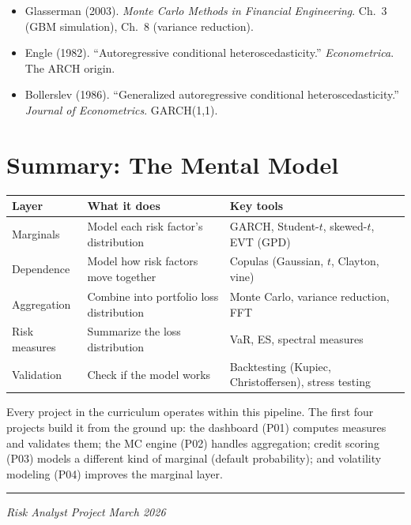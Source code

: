 \documentclass[11pt, a4paper]{article}
\theoremstyle{definition}
\theoremstyle{plain}
\theoremstyle{remark}
\begin{document}
\begin{refbox}
\begin{itemize}
    \item Glasserman (2003). \emph{Monte Carlo Methods in Financial Engineering}. Ch.~3 (GBM simulation), Ch.~8 (variance reduction).
    \item Engle (1982). ``Autoregressive conditional heteroscedasticity.'' \emph{Econometrica}. The ARCH origin.
    \item Bollerslev (1986). ``Generalized autoregressive conditional heteroscedasticity.'' \emph{Journal of Econometrics}. GARCH(1,1).
\end{itemize}
\end{refbox}

\section{Summary: The Mental Model}

\begin{center}
\begin{tabular}{@{}p{3cm}p{4.5cm}p{5cm}@{}}
\toprule
\textbf{Layer} & \textbf{What it does} & \textbf{Key tools} \\
\midrule
Marginals & Model each risk factor's distribution & GARCH, Student-$t$, skewed-$t$, EVT (GPD) \\
\addlinespace
Dependence & Model how risk factors move together & Copulas (Gaussian, $t$, Clayton, vine) \\
\addlinespace
Aggregation & Combine into portfolio loss distribution & Monte Carlo, variance reduction, FFT \\
\addlinespace
Risk measures & Summarize the loss distribution & VaR, ES, spectral measures \\
\addlinespace
Validation & Check if the model works & Backtesting (Kupiec, Christoffersen), stress testing \\
\bottomrule
\end{tabular}
\end{center}

Every project in the curriculum operates within this pipeline.
The first four projects build it from the ground up:
the dashboard (P01) computes measures and validates them;
the MC engine (P02) handles aggregation;
credit scoring (P03) models a different kind of marginal (default probability);
and volatility modeling (P04) improves the marginal layer.

\vfill
\hrule
\smallskip
\noindent\textit{Risk Analyst Project} \hfill \textit{March 2026}
\end{document}
